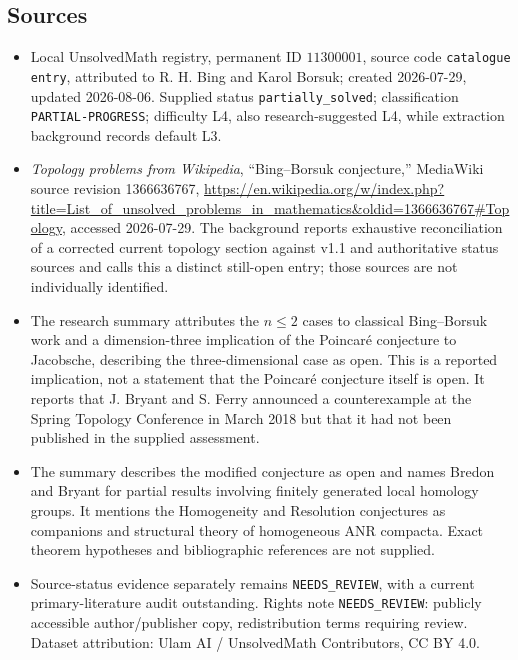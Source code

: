 \documentclass[11pt]{article}
\begin{document}
\subsection{Sources}
\begin{itemize}
\item Local UnsolvedMath registry, permanent ID $11300001$, source code \texttt{catalogue entry}, attributed to R. H. Bing and Karol Borsuk; created 2026-07-29, updated 2026-08-06. Supplied status \texttt{partially\_solved}; classification \texttt{PARTIAL-PROGRESS}; difficulty L4, also research-suggested L4, while extraction background records default L3.
\item \emph{Topology problems from Wikipedia}, ``Bing--Borsuk conjecture,'' MediaWiki source revision 1366636767, \url{https://en.wikipedia.org/w/index.php?title=List_of_unsolved_problems_in_mathematics&oldid=1366636767#Topology}, accessed 2026-07-29. The background reports exhaustive reconciliation of a corrected current topology section against v1.1 and authoritative status sources and calls this a distinct still-open entry; those sources are not individually identified.
\item The research summary attributes the $n\leq2$ cases to classical Bing--Borsuk work and a dimension-three implication of the Poincar\'e conjecture to Jacobsche, describing the three-dimensional case as open. This is a reported implication, not a statement that the Poincar\'e conjecture itself is open. It reports that J. Bryant and S. Ferry announced a counterexample at the Spring Topology Conference in March 2018 but that it had not been published in the supplied assessment.
\item The summary describes the modified conjecture as open and names Bredon and Bryant for partial results involving finitely generated local homology groups. It mentions the Homogeneity and Resolution conjectures as companions and structural theory of homogeneous ANR compacta. Exact theorem hypotheses and bibliographic references are not supplied.
\item Source-status evidence separately remains \texttt{NEEDS\_REVIEW}, with a current primary-literature audit outstanding. Rights note \texttt{NEEDS\_REVIEW}: publicly accessible author/publisher copy, redistribution terms requiring review. Dataset attribution: Ulam AI / UnsolvedMath Contributors, CC BY 4.0.
\end{itemize}
\end{document}
